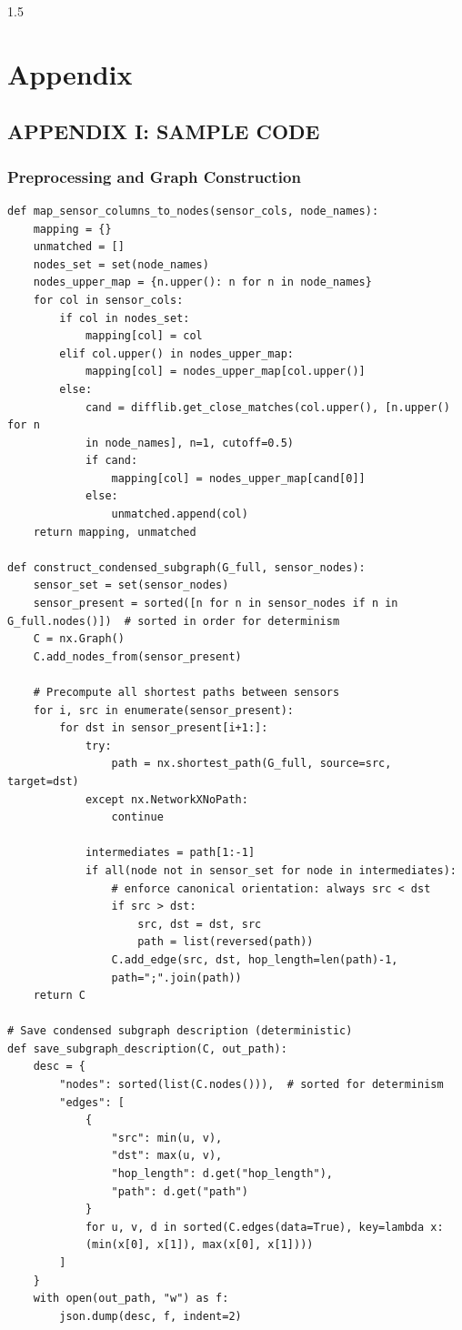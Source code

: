\newpage
\thispagestyle{empty}
%
\begin{spacing}{1.5}
%
%
\chapter*{Appendix}
\section{APPENDIX I: SAMPLE CODE}
\subsection*{Preprocessing and Graph Construction}
\begin{verbatim}
def map_sensor_columns_to_nodes(sensor_cols, node_names):
    mapping = {}
    unmatched = []
    nodes_set = set(node_names)
    nodes_upper_map = {n.upper(): n for n in node_names}
    for col in sensor_cols:
        if col in nodes_set:
            mapping[col] = col
        elif col.upper() in nodes_upper_map:
            mapping[col] = nodes_upper_map[col.upper()]
        else:
            cand = difflib.get_close_matches(col.upper(), [n.upper() for n
            in node_names], n=1, cutoff=0.5)
            if cand:
                mapping[col] = nodes_upper_map[cand[0]]
            else:
                unmatched.append(col)
    return mapping, unmatched

def construct_condensed_subgraph(G_full, sensor_nodes):
    sensor_set = set(sensor_nodes)
    sensor_present = sorted([n for n in sensor_nodes if n in G_full.nodes()])  # sorted in order for determinism
    C = nx.Graph()
    C.add_nodes_from(sensor_present)

    # Precompute all shortest paths between sensors
    for i, src in enumerate(sensor_present):
        for dst in sensor_present[i+1:]:
            try:
                path = nx.shortest_path(G_full, source=src, target=dst)
            except nx.NetworkXNoPath:
                continue

            intermediates = path[1:-1]
            if all(node not in sensor_set for node in intermediates):
                # enforce canonical orientation: always src < dst
                if src > dst:
                    src, dst = dst, src
                    path = list(reversed(path))
                C.add_edge(src, dst, hop_length=len(path)-1, 
                path=";".join(path))
    return C

# Save condensed subgraph description (deterministic)
def save_subgraph_description(C, out_path):
    desc = {
        "nodes": sorted(list(C.nodes())),  # sorted for determinism
        "edges": [
            {
                "src": min(u, v),
                "dst": max(u, v),
                "hop_length": d.get("hop_length"),
                "path": d.get("path")
            }
            for u, v, d in sorted(C.edges(data=True), key=lambda x: 
            (min(x[0], x[1]), max(x[0], x[1])))
        ]
    }
    with open(out_path, "w") as f:
        json.dump(desc, f, indent=2)


\end{verbatim}
\end{spacing}
